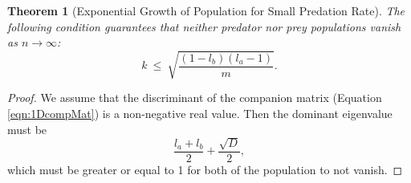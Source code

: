 \documentclass[11pt,reqno]{amsart}
\numberwithin{equation}{section}
\theoremstyle{plain}
\newtheorem{theorem}[thm]{Theorem}
\begin{document}
\begin{theorem}[Exponential Growth of 
Population for Small Predation Rate]
The following condition guarantees that neither predator nor prey populations vanish as $n \rightarrow \infty$: 
\begin{equation}
    k \ \leq \ \sqrt{
        \frac {(1 - l_b)(l_a - 1)} {m}
    }.
\end{equation}
\end{theorem}

\begin{proof}
    We assume that the discriminant of the companion matrix (Equation \ref{eqn:1DcompMat}) is a non-negative real value. 
    Then the dominant eigenvalue must be 
    \begin{equation}
        \frac {l_a + l_b} 2 + \frac {\sqrt D} 2,
    \end{equation}
    which must be greater or equal to 1 for both of the population to not vanish. 
\end{proof}
\end{document}
